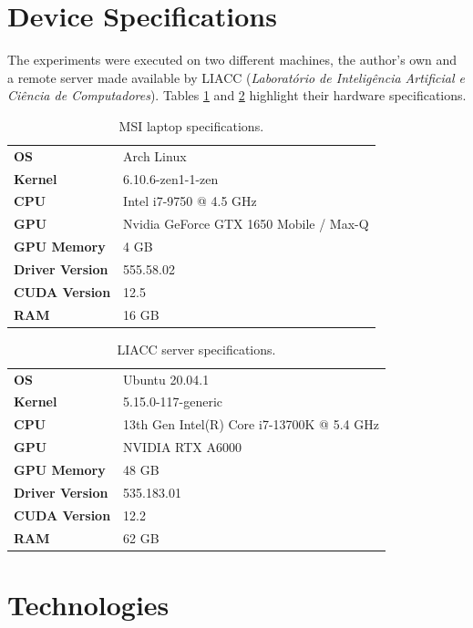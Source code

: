 \section{Device Specifications} \label{sec:method-specs}

The experiments were executed on two different machines, the author's own and a remote server made available by LIACC (\textit{Laboratório de Inteligência Artificial e Ciência de Computadores}). Tables \ref{tab:specs-msi} and \ref{tab:specs-liacc} highlight their hardware specifications.

\begin{table}[H]
	\caption{MSI laptop specifications.}
	\begin{tabular}{ll}
		\toprule
		\textbf{OS} & Arch Linux \\
		\textbf{Kernel} & 6.10.6-zen1-1-zen \\
		\textbf{CPU} & Intel i7-9750 @ 4.5 GHz \\
		\textbf{GPU} & Nvidia GeForce GTX 1650 Mobile / Max-Q \\
		\textbf{GPU Memory} & 4 GB  \\
		\textbf{Driver Version} & 555.58.02 \\
		\textbf{CUDA Version} & 12.5 \\
		\textbf{RAM} & 16 GB \\
		\bottomrule
	\end{tabular}
\label{tab:specs-msi}
\end{table}

\begin{table}[H]
	\caption{LIACC server specifications.}
	\begin{tabular}{ll}
		\toprule
		\textbf{OS} & Ubuntu 20.04.1 \\
		\textbf{Kernel} & 5.15.0-117-generic \\
		\textbf{CPU} & 13th Gen Intel(R) Core i7-13700K @ 5.4 GHz \\
		\textbf{GPU} & NVIDIA RTX A6000 \\
		\textbf{GPU Memory} & 48 GB \\
		\textbf{Driver Version} & 535.183.01 \\
		\textbf{CUDA Version} & 12.2 \\
		\textbf{RAM} & 62 GB \\
		\bottomrule
\end{tabular}
\label{tab:specs-liacc}
\end{table}

\section{Technologies} \label{sec:method-technologies}

